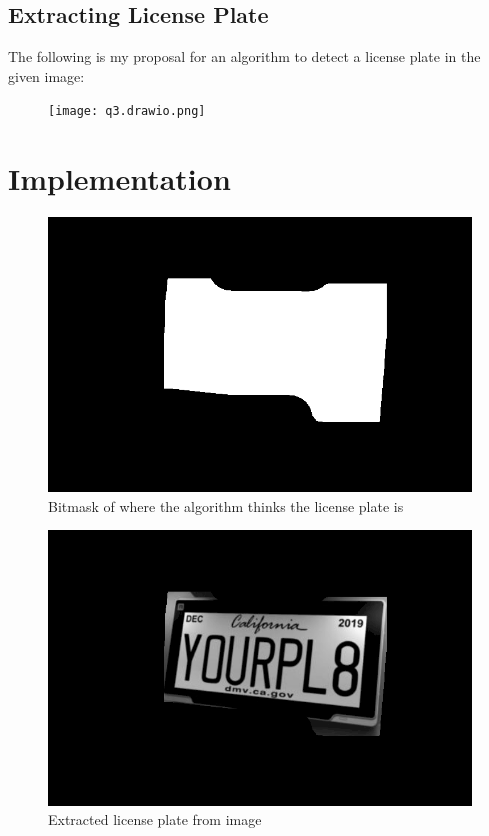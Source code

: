 \documentclass[12pt, letterpaper]{article}
\begin{document}
\subsection{Extracting License Plate}

The following is my proposal for an algorithm to detect a license plate in the given image:

\begin{figure}[H]
    \centering
    \texttt{[image: q3.drawio.png]}
\end{figure}

\section{Implementation}

\begin{figure}[H]
    \centering
    \includegraphics[width=\textwidth]{bitmask.png}
    \caption{Bitmask of where the algorithm thinks the license plate is}
\end{figure}

\begin{figure}[H]
    \centering
    \includegraphics[width=\textwidth]{license.png}
    \caption{Extracted license plate from image}
\end{figure}
\end{document}
